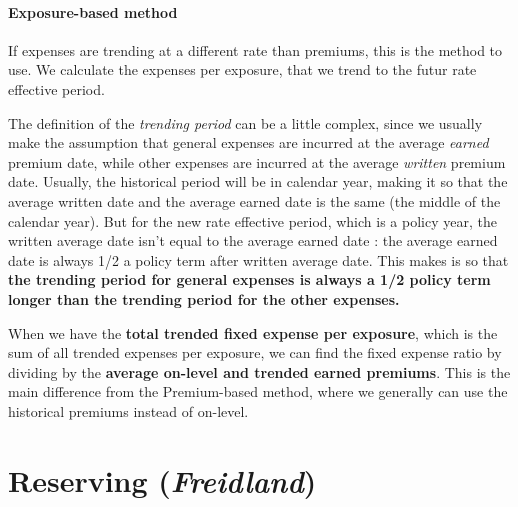 \documentclass[11pt, english]{memoir}
\numberwithin{definition}{section}
\begin{document}
	
	\subsection{Exposure-based method}
		If expenses are trending at a different rate than premiums, this is the method to use. We calculate the expenses per exposure, that we trend to the futur rate effective period.
		
		The definition of the \emph{trending period} can be a little complex, since we usually make the assumption that general expenses are incurred at the average \emph{earned} premium date, while other expenses are incurred at the average \emph{written} premium date. Usually, the historical period will be in calendar year, making it so that the average written date and the average earned date is the same (the middle of the calendar year). But for the new rate effective period, which is a policy year, the written average date isn't equal to the average earned date : the average earned date is always 1/2 a policy term after written average date. This makes is so that \textbf{the trending period for general expenses is always a 1/2 policy term longer than the trending period for the other expenses.} 
		
		
		When we have the \textbf{total trended fixed expense per exposure}, which is the sum of all trended expenses per exposure, we can find the fixed expense ratio by dividing by the \textbf{average on-level and trended earned premiums}. This is the main difference from the Premium-based method, where we generally can use the historical premiums instead of on-level.
	
	
	
	
	






























\part{Reserving (\emph{Freidland})}
	
\end{document}
